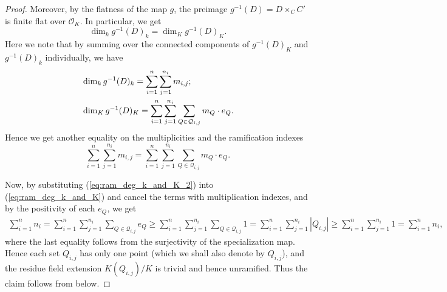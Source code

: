 \documentclass[11pt, letterpaper]{amsart}
\theoremstyle{plain}
\theoremstyle{definition}
\newcommand{\<}{\langle}
\renewcommand{\>}{\rangle}
\newcommand{\sO}{\mathcal{O}}
\begin{document}
\begin{proof}
    Moreover, by the flatness of the map $g$, the preimage $g^{-1}(D)=D\times_{C} C'$ is finite flat over $\sO_K$.
    In particular, we get
    \begin{equation}
    	\label{eq:equality_of_dim_of_divisors}
    	\dim_k g^{-1}(D)_k = \dim_K g^{-1}(D)_K.
    \end{equation}
    Here we note that by summing over the connected components of $g^{-1}(D)_K$ and $g^{-1}(D)_k$ individually, we have
    \begin{align}
    	\label{eq:expansion_of_g^{-1}D}
    	&\dim_k g^{-1}(D)_k  = \sum_{i = 1}^n \sum_{j = 1}^{n_i} m_{i, j};\\
    	&\dim_K g^{-1}(D)_K = \sum_{i = 1}^n \sum_{j = 1}^{n_i} \sum_{Q \in \mathcal{Q}_{i, j}}m_Q \cdot e_Q. 
    \end{align}
    Hence we get another equality on the multiplicities and the ramification indexes
    \begin{equation}
    	\label{eq:ram_deg_k_and_K_2}
    	\sum_{i = 1}^n \sum_{j = 1}^{n_i} m_{i, j} = \sum_{i = 1}^n \sum_{j = 1}^{n_i} \sum_{Q \in \mathcal{Q}_{i, j}} m_Q \cdot e_Q. 
    \end{equation}

    Now, by substituting (\ref{eq:ram_deg_k_and_K_2}) into (\ref{eq:ram_deg_k_and_K}) and cancel the terms with multiplication indexes, and by the positivity of each $e_Q$, we get
    \begin{align*}
    	    \sum_{i = 1}^n n_i = \sum_{i = 1}^n \sum_{j = 1}^{n_i} \sum_{Q \in \mathcal{Q}_{i, j}} e_Q  \geq \sum_{i = 1}^n \sum_{j = 1}^{n_i} \sum_{Q \in \mathcal{Q}_{i, j}} 1  = \sum_{i = 1}^n \sum_{j = 1}^{n_i} |Q_{i,j}| \geq \sum_{i = 1}^n \sum_{j = 1}^{n_i} 1 = \sum_{i = 1}^n n_i,
    \end{align*}
    where the last equality follows from the surjectivity of the specialization map.
    Hence each set $Q_{i,j}$ has only one point (which we shall also denote by $Q_{i,j}$), and the residue field extension $K(Q_{i,j})/K$ is trivial and hence unramified.
    Thus the claim follows from  below.
\end{proof}

\end{document}

